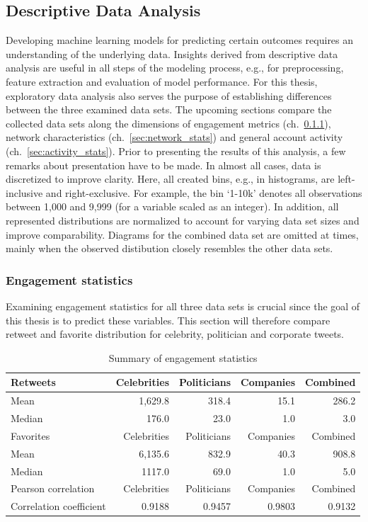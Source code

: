 \subsection{Descriptive Data Analysis}
\label{sec:dda}

Developing machine learning models for predicting certain outcomes requires
an understanding of the underlying data.
Insights derived from descriptive data analysis are useful in all steps of the
modeling process, e.g., for preprocessing, feature extraction and evaluation
of model performance.
For this thesis, exploratory data analysis also serves the purpose of establishing
differences between the three examined data sets.
The upcoming sections compare the collected data sets along the dimensions of
engagement metrics (ch.~\ref{sec:engagement_stats}), network characteristics
(ch.~\ref{sec:network_stats}) and general account activity (ch.~\ref{sec:activity_stats}).
Prior to presenting the results of this analysis, a few remarks about presentation
have to be made.
In almost all cases, data is discretized to improve clarity.
Here, all created bins, e.g., in histograms, are left-inclusive and right-exclusive.
For example, the bin `1-10k' denotes all observations between 1,000 and
9,999 (for a variable scaled as an integer).
In addition, all represented distributions are normalized to account for varying
data set sizes and improve comparability.
Diagrams for the combined data set are omitted at times, mainly when the observed
distibution closely resembles the other data sets.

\subsubsection{Engagement statistics}
\label{sec:engagement_stats}

Examining engagement statistics for all three data sets is crucial since the goal
of this thesis is to predict these variables.
This section will therefore compare retweet and favorite distribution for 
celebrity, politician and corporate tweets.

\begin{table}[h]
\centering
\begin{tabular}{lrrrr}
\toprule
  Retweets & Celebrities & Politicians & Companies & Combined\\
\midrule
  Mean & 1,629.8 & 318.4 & 15.1 & 286.2\\
  Median & 176.0 & 23.0 & 1.0 & 3.0 \\
\midrule
  Favorites & Celebrities & Politicians & Companies & Combined\\
\midrule
  Mean & 6,135.6 & 832.9 & 40.3 & 908.8 \\
  Median & 1117.0 & 69.0 & 1.0 & 5.0 \\
\midrule
  Pearson correlation & Celebrities & Politicians & Companies & Combined\\
\midrule
  Correlation coefficient & 0.9188 & 0.9457 & 0.9803 & 0.9132\\
\bottomrule
\end{tabular}
\caption{Summary of engagement statistics}
\label{tab:engagement_summary}
\end{table}

